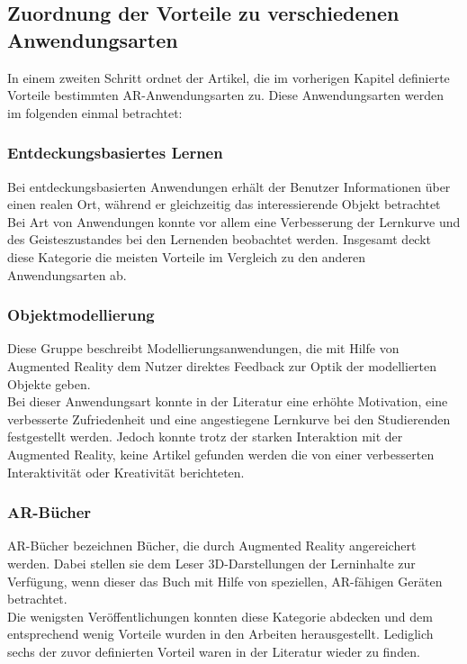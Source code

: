 \subsection{Zuordnung der Vorteile zu verschiedenen Anwendungsarten}
In einem zweiten Schritt ordnet der Artikel, die im vorherigen Kapitel definierte Vorteile bestimmten AR-Anwendungsarten zu. Diese Anwendungsarten werden im folgenden einmal betrachtet:

\subsubsection{Entdeckungsbasiertes Lernen}
Bei entdeckungsbasierten Anwendungen erhält der Benutzer \glqq Informationen über einen realen Ort, während er gleichzeitig das interessierende Objekt betrachtet\grqq{} \citep[Kapitel 2.2]{diegmann:benefits-ar} \\
Bei Art von Anwendungen konnte vor allem eine Verbesserung der Lernkurve und des Geisteszustandes bei den Lernenden beobachtet werden. Insgesamt deckt diese Kategorie die meisten Vorteile im Vergleich zu den anderen Anwendungsarten ab.
\citep[Kapitel 5]{diegmann:benefits-ar} \\
\subsubsection{Objektmodellierung}
Diese Gruppe beschreibt Modellierungsanwendungen, die mit Hilfe von Augmented Reality dem Nutzer direktes Feedback zur Optik der modellierten Objekte geben. \citep[Kapitel 2.2]{diegmann:benefits-ar} \\
Bei dieser Anwendungsart konnte in der Literatur eine erhöhte Motivation, eine verbesserte Zufriedenheit und eine angestiegene Lernkurve bei den Studierenden festgestellt werden. Jedoch konnte trotz der starken Interaktion mit der Augmented Reality, keine Artikel gefunden werden die von einer verbesserten Interaktivität oder Kreativität berichteten. \citep[Kapitel 5]{diegmann:benefits-ar}

\subsubsection{AR-Bücher}
AR-Bücher bezeichnen Bücher, die durch Augmented Reality angereichert werden. Dabei stellen sie dem Leser 3D-Darstellungen der Lerninhalte zur Verfügung, wenn dieser das Buch mit Hilfe von speziellen, AR-fähigen Geräten betrachtet. \citep[Kapitel 2.2]{diegmann:benefits-ar}\\
Die wenigsten Veröffentlichungen konnten diese Kategorie abdecken und dem entsprechend wenig Vorteile wurden in den Arbeiten herausgestellt. Lediglich sechs der zuvor definierten Vorteil waren in der Literatur wieder zu finden. \citep[Kapitel 5]{diegmann:benefits-ar}

